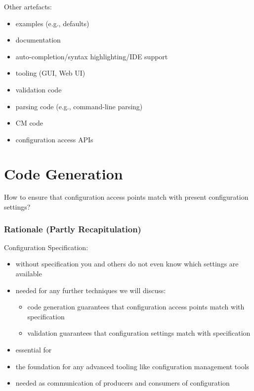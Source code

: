 \begin{frame}
	Other artefacts:

	\begin{itemize}
	\item examples (e.g., defaults)
	\item documentation
	\item auto-completion/syntax highlighting/IDE support
	\item tooling (GUI, Web UI)
	\item validation code
	\item parsing code (e.g., command-line parsing)
	\item CM code
	\item configuration access APIs
	\end{itemize}
\end{frame}



\section{Code Generation}

\begin{assignment}
	\begin{task}
	How to ensure that configuration access points match with present configuration settings?
	\end{task}
\end{assignment}

\begin{frame}
	\frametitle{Rationale (Partly Recapitulation)}
	Configuration Specification:
	\begin{itemize}
	\item without specification you and others do not even know which settings are available
	\item needed for any further techniques we will discuss:
		\begin{itemize}
		\color{red}
		\item code generation guarantees that configuration access points match with specification
		\item validation guarantees that configuration settings match with specification
		\end{itemize}
	\item essential for ~\citet{holland2001nofutz}
	\item the foundation for any advanced tooling like configuration management tools
	\item needed as communication of producers and consumers of configuration
	\end{itemize}
\end{frame}

